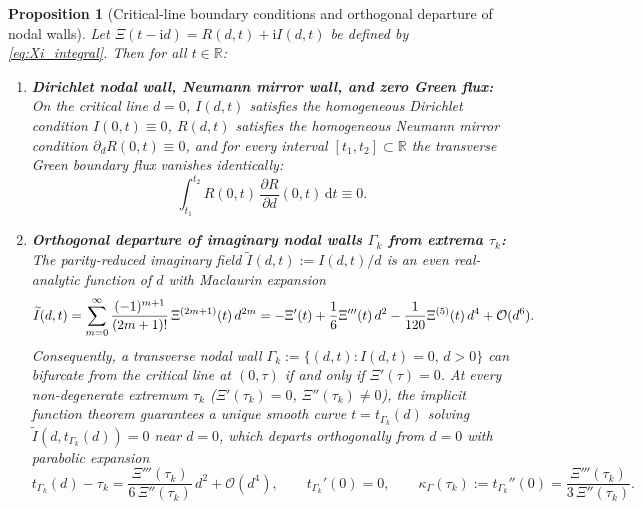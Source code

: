 \documentclass[11pt,a4paper,reqno]{amsart}
\newtheorem{proposition}[theorem]{Proposition}
\theoremstyle{definition}
\theoremstyle{remark}
\numberwithin{equation}{section}
\newcommand{\dd}{\mathrm{d}}
\newcommand{\ii}{\mathrm{i}}
\newcommand{\fac}{\mathclose{\mathchar"0021}}
\begin{document}
\begin{proposition}[Critical-line boundary conditions and orthogonal departure of nodal walls]\label{prop:boundary_conditions}
Let $\Xi(t-\ii d) = R(d,t) + \ii I(d,t)$ be defined by \eqref{eq:Xi_integral}. Then for all $t \in \mathbb{R}$:
\begin{enumerate}
\item[\textup{(a)}] \textbf{Dirichlet nodal wall, Neumann mirror wall, and zero Green flux:} On the critical line $d = 0$, $I(d,t)$ satisfies the homogeneous Dirichlet condition $I(0,t) \equiv 0$, $R(d,t)$ satisfies the homogeneous Neumann mirror condition $\partial_d R(0,t) \equiv 0$, and for every interval $[t_1, t_2] \subset \mathbb{R}$ the transverse Green boundary flux vanishes identically:
\begin{equation}\label{eq:green_flux}
\int_{t_1}^{t_2} R(0,t)\,\frac{\partial R}{\partial d}(0,t)\,\dd t \equiv 0.
\end{equation}
\item[\textup{(b)}] \textbf{Orthogonal departure of imaginary nodal walls $\Gamma_k$ from extrema $\tau_k$:} The parity-reduced imaginary field $\widetilde{I}(d,t) := I(d,t)/d$ is an even real-analytic function of $d$ with Maclaurin expansion
\begin{equation}\label{eq:Itil_maclaurin}
\widetilde{I}(d,t) = \sum_{m=0}^\infty \frac{(-1)^{m+1}}{(2m+1)\fac}\,\Xi^{(2m+1)}(t)\,d^{2m} = -\Xi'(t) + \frac{1}{6}\Xi'''(t)\,d^2 - \frac{1}{120}\Xi^{(5)}(t)\,d^4 + \mathcal{O}(d^6).
\end{equation}
Consequently, a transverse nodal wall $\Gamma_k := \{(d,t) : I(d,t) = 0,\, d > 0\}$ can bifurcate from the critical line at $(0, \tau)$ if and only if $\Xi'(\tau) = 0$. At every non-degenerate extremum $\tau_k$ ($\Xi'(\tau_k) = 0$, $\Xi''(\tau_k) \neq 0$), the implicit function theorem guarantees a unique smooth curve $t = t_{\Gamma_k}(d)$ solving $\widetilde{I}(d, t_{\Gamma_k}(d)) = 0$ near $d = 0$, which departs orthogonally from $d = 0$ with parabolic expansion
\begin{equation}\label{eq:wall_curvature}
t_{\Gamma_k}(d) - \tau_k = \frac{\Xi'''(\tau_k)}{6\,\Xi''(\tau_k)}\,d^2 + \mathcal{O}(d^4), \qquad t_{\Gamma_k}'(0) = 0, \qquad \kappa_\Gamma(\tau_k) := t_{\Gamma_k}''(0) = \frac{\Xi'''(\tau_k)}{3\,\Xi''(\tau_k)}.
\end{equation}
\end{enumerate}
\end{proposition}
\end{document}
